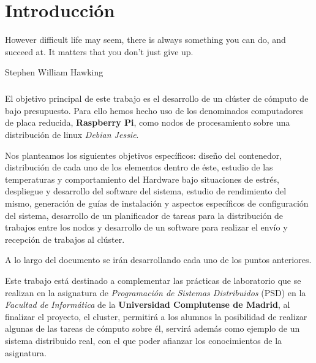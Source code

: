\newpage

\chapter{Introducción}

\label{ch:capitulo1.tex}

\begin{FraseCelebre}
	\begin{Frase}
		However difficult life may seem, there is always something you can do, and succeed at. It matters that you don’t just give up.
	\end{Frase}
	\begin{Fuente}
	Stephen William Hawking
	\end{Fuente}
\end{FraseCelebre}

\paragraph{}
El objetivo principal de este trabajo es el desarrollo de un clúster de cómputo de bajo presupuesto. Para ello hemos hecho uso de los denominados computadores de placa reducida, \textbf{Raspberry Pi}, como nodos de procesamiento sobre una distribución de linux \textit{Debian Jessie}. 

Nos planteamos los siguientes objetivos específicos: diseño del contenedor, distribución de cada uno de los elementos dentro de éste, estudio de las temperaturas y comportamiento del Hardware bajo situaciones de estrés, despliegue y desarrollo del software del sistema, estudio de rendimiento del mismo, generación de guías de instalación y aspectos específicos de configuración del sistema, desarrollo de un planificador de tareas para la distribución de trabajos entre los nodos y desarrollo de un  software para realizar el envío y recepción de trabajos al clúster.

A lo largo del documento se irán desarrollando cada uno de los puntos anteriores.

Este trabajo está destinado a complementar las prácticas de laboratorio que se realizan en la asignatura de \textit{Programación de Sistemas Distribuidos} (PSD) en la \textit{Facultad de Informática} de la \textbf{Universidad Complutense de Madrid}, al finalizar el proyecto, el cluster, permitirá a los alumnos la posibilidad de realizar algunas de las tareas de cómputo sobre él, servirá además como ejemplo de un sistema distribuido real, con el que poder afianzar los conocimientos de la asignatura.

